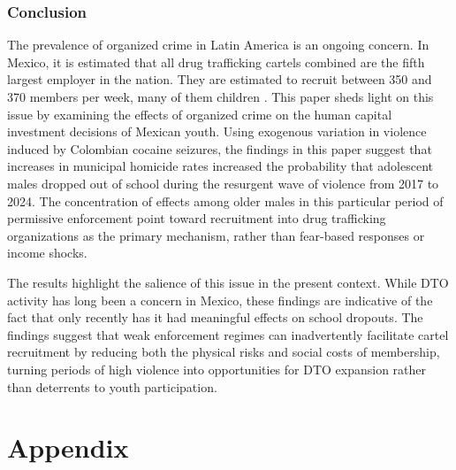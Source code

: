 \documentclass[12pt,letter,english,intoc,bibliography=totoc,index=totoc,BCOR10mm,captions=tableheading,nottitlepage,fleqn]{article}
\theoremstyle{break}
\begin{document}
\section{Conclusion}
The prevalence of organized crime in Latin America is an ongoing concern. In Mexico, it is estimated that all drug trafficking cartels combined are the fifth largest employer in the nation. They are estimated to recruit between 350 and 370 members per week, many of them children \citep{prieto2023}. This paper sheds light on this issue by examining the effects of organized crime on the human capital investment decisions of Mexican youth. Using exogenous variation in violence induced by Colombian cocaine seizures, the findings in this paper suggest that increases in municipal homicide rates increased the probability that adolescent males dropped out of school during the resurgent wave of violence from 2017 to 2024. The concentration of effects among older males in this particular period of permissive enforcement point toward recruitment into drug trafficking organizations as the primary mechanism, rather than fear-based responses or income shocks. 

The results highlight the salience of this issue in the present context. While DTO activity has long been a concern in Mexico, these findings are indicative of the fact that only recently has it had meaningful effects on school dropouts. The findings suggest that weak enforcement regimes can inadvertently facilitate cartel recruitment by reducing both the physical risks and social costs of membership, turning periods of high violence into opportunities for DTO expansion rather than deterrents to youth participation.
\clearpage
\newpage



\newpage
\appendix
\part*{Appendix} %
\localtableofcontents
\setcounter{table}{0}
\renewcommand{\thetable}{A\arabic{table}}
\setcounter{figure}{0}
\renewcommand{\thefigure}{A\arabic{figure}}
\makeatletter
  \renewcommand{\theHtable}{A\arabic{table}}
  \renewcommand{\theHfigure}{A\arabic{figure}}
\makeatother
\end{document}
